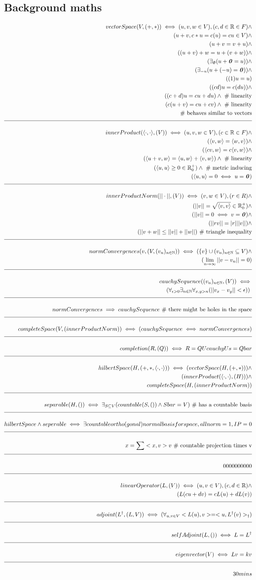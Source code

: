 \documentclass[a4paper]{article}
\newcommand{\eqComment}[1]{\text{  \# #1}}
\newcommand{\n}{\\[1.5ex] \hline \nonumber \\[0ex]}
\newcommand{\m}{\nonumber \\}
\newcommand{\field}[1]{\textbf{\textit{#1}}}
\begin{document}
\subsection{Background maths}
\begin{tcolorbox}
\begin{align}
   vectorSpace(V, (+, *)) \iff (u, v, w \in V), (c, d \in \mathbb{R} \in F) \land
\m (u + v, c * u = c (u) = c u \in V) \land
\m (u + v = v + u) \land
\m ((u + v) + w = u + (v + w)) \land
\m (\exists_\field{0} (u + \field{0} = u)) \land
\m (\exists_{-u} (u + (-u) = \field{0})) \land
\m ((1) u = u)
\m ((c d) u = c (d u)) \land
\m ((c + d) u = c u + d u) \land \eqComment{linearity}
\m (c (u + v) = c u + c v) \land \eqComment{linearity}
\m \eqComment{behaves similar to vectors}
\n innerProduct(\langle \cdot, \cdot \rangle, (V)) \iff (u, v, w \in V), (c \in \mathbb{R} \in F) \land
\m (\langle v, w \rangle = \langle w, v \rangle) \land
\m (\langle c v, w \rangle = c \langle v, w \rangle) \land
\m (\langle u + v, w \rangle = \langle u, w \rangle + \langle v, w \rangle) \land \eqComment{linearity}
\m (\langle u, u \rangle \geq 0 \in \mathbb{R}^+_0) \land \eqComment{metric inducing}
\m (\langle u, u \rangle = 0 \iff u = \field{0})
\n innerProductNorm(||\cdot||, (V)) \iff (v, w \in V), (r \in R) \land
\m (||v|| = \sqrt{\langle v , v \rangle} \in \mathbb{R}^+_0) \land
\m (||v|| = 0 \iff v = \field{0}) \land
\m (||r v|| = |r| ||v||) \land 
\m (|| v + w || \leq ||v|| + || w ||) \eqComment{triangle inequality}
\n normConvergences(v, (V, (v_n)_{n \in \mathbb{N}})) \iff (\{v\} \cup (v_n)_{n \in \mathbb{N}} \subseteq V) \land
\m (\lim_{n \to \infty} ||v - v_n|| = 0)
\n cauchySequence((v_n)_{n \in \mathbb{N}}, (V)) \iff \m (\forall_{\epsilon > 0} \exists_{n \in \mathbb{N}} \forall_{x, y > n} (|| v_x - v_y || < \epsilon))\
\n normConvergences \implies cauchySequence \eqComment{there might be holes in the space}
\n completeSpace(V, (innerProductNorm)) \iff (cauchySequence \iff normConvergences)
\n completion(R, (Q)) \iff R = Q U cauchy Us = Q bar
\n hilbertSpace(H, (+, *, \langle \cdot, \cdot \rangle)) \iff (vectorSpace(H, (+, *))) \land
\m (innerProduct(\langle \cdot, \cdot \rangle, (H))) \land
\m completeSpace(H, (innerProductNorm))
\n separable(H, ()) \iff \exists_{S \subseteq V} (countable(S, ()) \land Sbar = V) \eqComment{has a countable basis}
\n hilbertSpace \land seperable \iff \exists countable ortho(gonal)normal basis for space, all norm=1, IP=0
\n x = \sum <x, v> v \eqComment{countable projection times v}
\n 0000000000
\n linearOperator(L, (V)) \iff (u, v \in V) , (c, d \in \mathbb{R}) \land
\m (L(c u + d v) = c L(u) + d L(v))
\n adjoint(L^\dagger, (L, V)) \iff (\forall_{u, v \in V} <L(u), v> = <u, L^\dagger(v)>_\dagger )
\n selfAdjoint(L, ()) \iff L = L^\dagger
\n eigenvector(V) \iff L v = k v
\n 30 mins
\end {align}
\end{tcolorbox}
\end{document}
